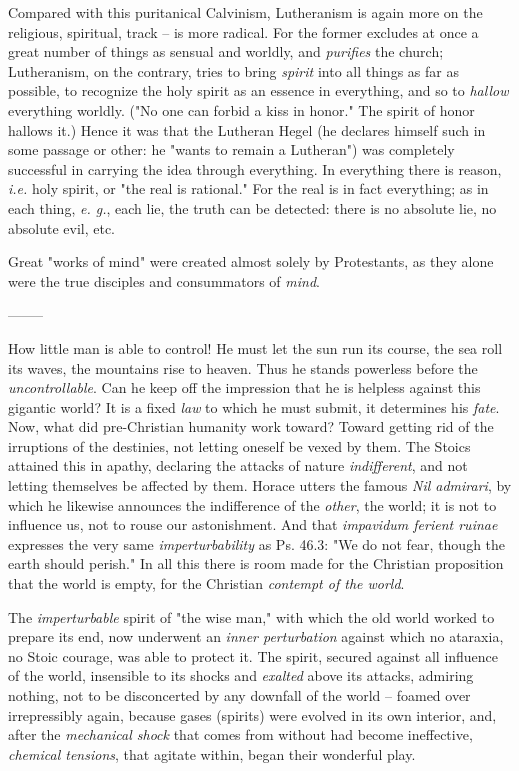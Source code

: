Compared with this puritanical Calvinism, Lutheranism is again more on the 
religious, spiritual, track -- is more radical. For the former excludes at 
once a great number of things as sensual and worldly, and \textit{purifies} 
the church; Lutheranism, on the contrary, tries to bring \textit{spirit} into 
all things as far as possible, to recognize the holy spirit as an essence in 
everything, and so to \textit{hallow} everything worldly. ("{}No one can 
forbid a kiss in honor."{} The spirit of honor hallows it.) Hence it was that 
the Lutheran Hegel (he declares himself such in some passage or other: he 
"{}wants to remain a Lutheran"{}) was completely successful in carrying the 
idea through everything. In everything there is reason, \textit{i.e.} holy 
spirit, or "{}the real is rational."{} For the real is in fact everything; as 
in each thing, \textit{e. g.}, each lie, the truth can be detected: there is 
no absolute lie, no absolute evil, etc.

Great "{}works of mind"{} were created almost solely by Protestants, as they 
alone were the true disciples and consummators of \textit{mind}.

\begin{center}
--------\end{center}


How little man is able to control! He must let the sun run its course, the sea 
roll its waves, the mountains rise to heaven. Thus he stands powerless before 
the \textit{uncontrollable}. Can he keep off the impression that he is 
helpless against this gigantic world? It is a fixed \textit{law} to which he 
must submit, it determines his \textit{fate}. Now, what did pre-Christian 
humanity work toward? Toward getting rid of the irruptions of the destinies, 
not letting oneself be vexed by them. The Stoics attained this in apathy, 
declaring the attacks of nature \textit{indifferent}, and not letting 
themselves be affected by them. Horace utters the famous \textit{Nil 
admirari}, by which he likewise announces the indifference of the 
\textit{other}, the world; it is not to influence us, not to rouse our 
astonishment. And that \textit{impavidum ferient ruinae} expresses the very 
same \textit{imperturbability} as Ps. 46.3: "{}We do not fear, though the 
earth should perish."{} In all this there is room made for the Christian 
proposition that the world is empty, for the Christian \textit{contempt of the 
world}.

The \textit{imperturbable} spirit of "{}the wise man,"{} with which the old 
world worked to prepare its end, now underwent an \textit{inner perturbation} 
against which no ataraxia, no Stoic courage, was able to protect it. The 
spirit, secured against all influence of the world, insensible to its shocks 
and \textit{exalted} above its attacks, admiring nothing, not to be 
disconcerted by any downfall of the world -- foamed over irrepressibly again, 
because gases (spirits) were evolved in its own interior, and, after the 
\textit{mechanical shock} that comes from without had become ineffective, 
\textit{chemical tensions}, that agitate within, began their wonderful play.

